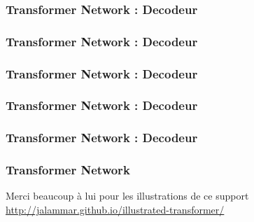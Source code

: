 \documentclass{formation}
\begin{document}
\begin{frame}
  \frametitle{Transformer Network : Decodeur}
\end{frame}

\begin{frame}
  \frametitle{Transformer Network : Decodeur}
\end{frame}

\begin{frame}
  \frametitle{Transformer Network : Decodeur}
\end{frame}

\begin{frame}
  \frametitle{Transformer Network : Decodeur}
\end{frame}

\begin{frame}
  \frametitle{Transformer Network : Decodeur}
\end{frame}

\begin{frame}
  \frametitle{Transformer Network}
  Merci beaucoup à lui pour les illustrations de ce support
  \url{http://jalammar.github.io/illustrated-transformer/}
\end{frame}
\end{document}
